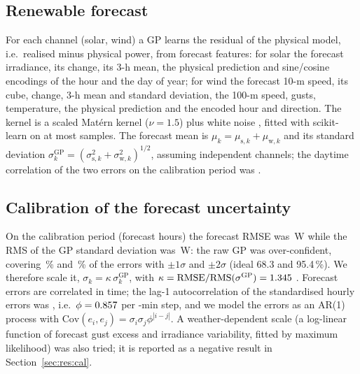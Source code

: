 \documentclass[a4paper,fleqn]{cas-dc}
\begin{document}
\subsection{Renewable forecast}
For each channel (solar, wind) a GP learns the residual of the physical model, i.e.\ realised minus physical power, from forecast features: for solar the forecast irradiance, its change, its 3-h mean, the physical prediction and sine/cosine encodings of the hour and the day of year; for wind the forecast 10-m speed, its cube, change, 3-h mean and standard deviation, the 100-m speed, gusts, temperature, the physical prediction and the encoded hour and direction. The kernel is a scaled Matérn kernel ($\nu=1.5$) plus white noise \cite{rasmussen2006gaussian}, fitted with scikit-learn \cite{pedregosa2011scikit} on at most \gprsamples samples. The forecast mean is $\mu_k=\mu_{\mathrm{s},k}+\mu_{\mathrm{w},k}$ and its standard deviation $\sigma^{\mathrm{GP}}_k=(\sigma^2_{\mathrm{s},k}+\sigma^2_{\mathrm{w},k})^{1/2}$, assuming independent channels; the daytime correlation of the two errors on the calibration period was \swcorr.

\subsection{Calibration of the forecast uncertainty}
On the calibration period (\calhours forecast hours) the forecast RMSE was \calrmse\,W while the RMS of the GP standard deviation was \calrmssigma\,W: the raw GP was over-confident, covering \covRawOne\,\% and \covRawTwo\,\% of the errors with $\pm1\sigma$ and $\pm2\sigma$ (ideal 68.3 and 95.4\,\%). We therefore scale it, $\sigma_k=\kappa\,\sigma^{\mathrm{GP}}_k$, with $\kappa=\mathrm{RMSE}/\mathrm{RMS}(\sigma^{\mathrm{GP}})=1.345$ \cite{gneiting2007probabilistic}. Forecast errors are correlated in time; the lag-1 autocorrelation of the standardised hourly errors was \phihour, i.e.\ $\phi=0.857$ per \dtmin-min step, and we model the errors as an AR(1) process with $\mathrm{Cov}(e_i,e_j)=\sigma_i\sigma_j\phi^{|i-j|}$. A weather-dependent scale (a log-linear function of forecast gust excess and irradiance variability, fitted by maximum likelihood) was also tried; it is reported as a negative result in Section~\ref{sec:res:cal}.
\end{document}
